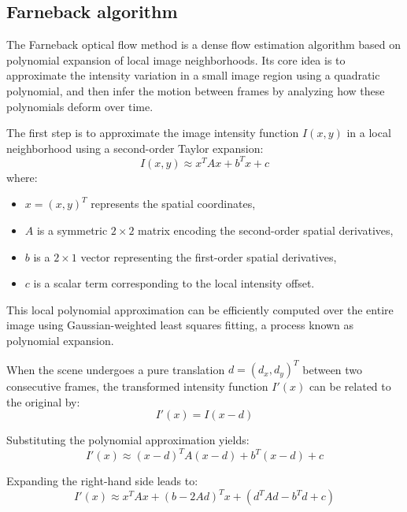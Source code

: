 \subsection{Farneback algorithm}
\label{sec:FarnebackAlgorithm}

The Farneback optical flow method is a dense flow estimation algorithm based on polynomial
expansion of local image neighborhoods. Its core idea is to approximate the intensity variation in
a small image region using a quadratic polynomial, and then infer the motion between frames by
analyzing how these polynomials deform over time.

The first step is to approximate the image intensity function $I(x, y)$ in a local neighborhood
using a second-order Taylor expansion:
\begin{equation}
I(x, y) \approx x^T A x + b^T x + c
\end{equation}
where:
\begin{itemize}
  \item $x = (x, y)^T$ represents the spatial coordinates,
  \item $A$ is a symmetric $2\times2$ matrix encoding the second-order spatial derivatives,
  \item $b$ is a $2\times1$ vector representing the first-order spatial derivatives,
  \item $c$ is a scalar term corresponding to the local intensity offset.
\end{itemize}

This local polynomial approximation can be efficiently computed over the entire image using
Gaussian-weighted least squares fitting, a process known as polynomial expansion.

When the scene undergoes a pure translation $d = (d_x, d_y)^T$ between two consecutive frames,
the transformed intensity function $I'(x)$ can be related to the original by:
\begin{equation}
I'(x) = I(x - d)
\end{equation}

Substituting the polynomial approximation yields:
\begin{equation}
I'(x) \approx (x - d)^T A (x - d) + b^T (x - d) + c
\end{equation}

Expanding the right-hand side leads to:
\begin{equation}
I'(x) \approx x^T A x + (b - 2Ad)^T x + (d^T A d - b^T d + c)
\end{equation}

